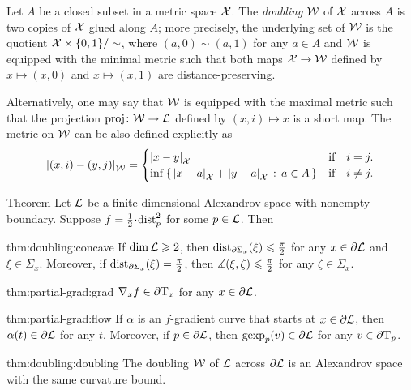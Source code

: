 Let $A$ be a closed subset in a metric space $\mathcal{X}$.
The \emph{doubling} $\mathcal{W}$ of $\mathcal{X}$ across $A$ is two copies of $\mathcal{X}$ glued along $A$;
more precisely, the underlying set of $\mathcal{W}$ is the quotient $\mathcal{X}\times\{0,1\}/\sim$, where $(a,0)\sim (a,1)$ for any $a\in A$ and $\mathcal{W}$ is equipped with the minimal metric such that both maps $\mathcal{X}\to \mathcal{W}$ defined by $x\mapsto (x,0)$ and $x\mapsto (x,1)$ are distance-preserving.

Alternatively, one may say that $\mathcal{W}$ is equipped with the maximal metric such that the projection $\operatorname{\rm proj}\nolimits\colon\mathcal{W}\to\mathcal{L}$ defined by $(x,i)\mapsto x$ is a short map. 
The metric on $\mathcal{W}$ can be also defined explicitly as
\[|{(x,i)}-{(y,j)}|_{\mathcal{W}}^{{}}=
\begin{cases}
|{x}-{y}|_{\mathcal{X}}^{{}}&\text{if}\quad i= j.
\\
\inf\left\{\,{|{x}-{a}|_{\mathcal{X}}^{{}}+|{y}-{a}|_{\mathcal{X}}^{{}}}\,:\,{a\in A}\,\right\}&\text{if}\quad i\ne j.
\end{cases}
\]

\begin{thm}{Theorem}\label{thm:doubling}
Let $\mathcal{L}$ be a finite-dimensional Alexandrov space with nonempty boundary.
Suppose $f\z=\tfrac12\cdot\distfun_p^2$ for some $p\in \mathcal{L}$.
Then

\begin{subthm}{thm:doubling:concave}
If $\operatorname{\rm dim}\nolimits \mathcal{L}\geqslant 2$, then
$\mathrm{dist}_{\partial \Sigma_x}(\xi)\leqslant \tfrac\pi2$ for any $x\in\partial \mathcal{L}$ and $\xi\in \Sigma_x$.
Moreover, if $\mathrm{dist}_{\partial \Sigma_x}(\xi)= \tfrac\pi2$, then $\measuredangle(\xi,\zeta)\leqslant\tfrac\pi2$ for any $\zeta\in \Sigma_x$. 
\end{subthm}

\begin{subthm}{thm:partial-grad:grad}
$\nabla_xf\in \partial\mathrm{T}_x$ for any $x\in\partial \mathcal{L}$.
\end{subthm}

\begin{subthm}{thm:partial-grad:flow}
If $\alpha$ is an $f$-gradient curve that starts at $x\in \partial \mathcal{L}$, then $\alpha(t)\in \partial \mathcal{L}$ for any $t$.
Moreover, if $p\in \partial \mathcal{L}$, then $\operatorname{\rm gexp}\nolimits_p(v)\in \partial \mathcal{L}$ for any $v\in\partial\mathrm{T}_p$.
\end{subthm}

\begin{subthm}{thm:doubling:doubling}
The doubling $\mathcal{W}$ of $\mathcal{L}$ across $\partial \mathcal{L}$ is an Alexandrov space with the same curvature bound.
\end{subthm}

\end{thm}


